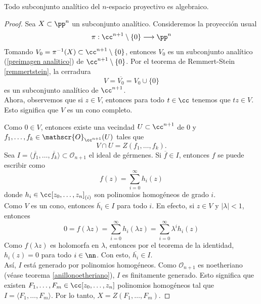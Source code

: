 \begin{theorem}
	Todo subconjunto analítico del $n$-espacio proyectivo es algebraico.
\end{theorem}
	\begin{proof}\parencite{chirka}
		Sea $X\subset \pp^n$ un subconjunto analítico. Consideremos la proyección usual
		\begin{align*}
			\pi:\cc^{n+1}\setminus\{0\}\longrightarrow \pp^n
		\end{align*}
		Tomando $V_0=\pi^{-1}(X)\subset \cc^{n+1}\setminus\{0\}$, entonces $V_0$ es un subconjunto analítico (\ref{preimagen analitico}) de $\cc^{n+1}\setminus\{0\}$. Por el teorema de Remmert-Stein \ref{remmertstein}, la cerradura 
		\begin{equation*}
			V=\overline{V_0}=V_0\cup\{0\}
		\end{equation*}
		es un subconjunto analítico de $\cc^{n+1}$.\\
		Ahora, observemos que  si $z\in V$, entonces para todo $t\in\cc$ tenemos que $tz\in V$. Esto significa que $V$ es un cono completo.
		
		Como $0\in V$, entonces existe una vecindad $U\subset\cc^{n+1}$ de $0$ y $f_1,\dots,f_k\in\mathscr{O}_{\cc^{n+1}}(U)$ tales que 
		\begin{equation*}
			V\cap U=Z(f_1,\dots,f_k).
		\end{equation*}
		Sea $I=\langle \overline{f_1},\dots,\overline{f_k} \rangle\subset \mathscr{O}_{n+1}$ el ideal de gérmenes. Si $\overline{f}\in I$, entonces $f$ se puede escribir como 
		\begin{equation*}
			f(z)=\sum_{i=0}^{\infty}h_i(z)
		\end{equation*}
		donde $h_i\in\cc[z_0,\dots,z_n]_{(i)}$ son polinomios homogéneos de grado $i$.\\
		Como $V$ es un cono, entonces $\overline{h_i}\in I$ para todo $i$. En efecto, si $z\in V$ y $|\lambda|<1$, entonces 
		\begin{equation*}
			0=f(\lambda z)=\sum_{i=0}^{\infty}h_i(\lambda z)=\sum_{i=0}^{\infty}\lambda^ih_i( z)
		\end{equation*}
		Como $f(\lambda z)$ es holomorfa en $\lambda$, entonces por el teorema de la identidad, $h_i(z)=0$ para todo $i\in\nn$. Con esto, $\overline{h_i}\in I$.\\
		Así, $I$ está generado por polinomios homogéneos. Como $\mathscr{O}_{n+1}$ es noetheriano (véase teorema \ref{anillonoetheriano}), $I$ es finitamente generado. Esto significa que existen $F_1,\dots, F_m\in\cc[z_0,\dots,z_n]$ polinomios homogéneos tal que $I=\langle F_1,\dots, F_m \rangle$.
		Por lo tanto, $X=Z(F_1,\dots,F_m)$.
	\end{proof}
	
